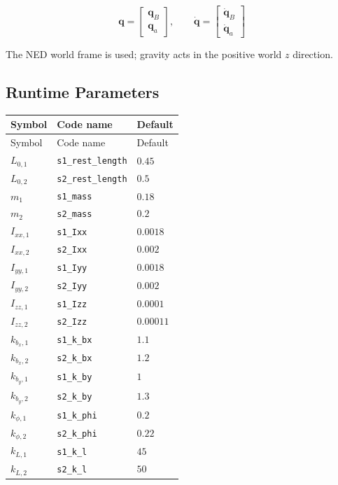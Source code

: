 \documentclass[11pt]{article}
\begin{document}
\begin{equation}
\boldsymbol q=\begin{bmatrix}\boldsymbol q_B\\\boldsymbol q_a\end{bmatrix},\qquad \dot{\boldsymbol q}=\begin{bmatrix}\dot{\boldsymbol q}_B\\\dot{\boldsymbol q}_a\end{bmatrix}
\end{equation}

The NED world frame is used; gravity acts in the positive world $z$ direction.
\subsection{Runtime Parameters}
\begin{longtable}{lll}
\hline
Symbol & Code name & Default \\
\hline
\endfirsthead
\hline Symbol & Code name & Default \\
\hline
\endhead
$L_{0,1}$ & \texttt{s1\_rest\_length} & $0.45$ \\
$L_{0,2}$ & \texttt{s2\_rest\_length} & $0.5$ \\
$m_{1}$ & \texttt{s1\_mass} & $0.18$ \\
$m_{2}$ & \texttt{s2\_mass} & $0.2$ \\
$I_{xx,1}$ & \texttt{s1\_Ixx} & $0.0018$ \\
$I_{xx,2}$ & \texttt{s2\_Ixx} & $0.002$ \\
$I_{yy,1}$ & \texttt{s1\_Iyy} & $0.0018$ \\
$I_{yy,2}$ & \texttt{s2\_Iyy} & $0.002$ \\
$I_{zz,1}$ & \texttt{s1\_Izz} & $0.0001$ \\
$I_{zz,2}$ & \texttt{s2\_Izz} & $0.00011$ \\
$k_{b_x,1}$ & \texttt{s1\_k\_bx} & $1.1$ \\
$k_{b_x,2}$ & \texttt{s2\_k\_bx} & $1.2$ \\
$k_{b_y,1}$ & \texttt{s1\_k\_by} & $1$ \\
$k_{b_y,2}$ & \texttt{s2\_k\_by} & $1.3$ \\
$k_{\phi,1}$ & \texttt{s1\_k\_phi} & $0.2$ \\
$k_{\phi,2}$ & \texttt{s2\_k\_phi} & $0.22$ \\
$k_{L,1}$ & \texttt{s1\_k\_l} & $45$ \\
$k_{L,2}$ & \texttt{s2\_k\_l} & $50$ \\

\end{longtable}
\end{document}
